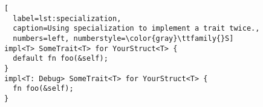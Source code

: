 \begin{lstlisting}[
  label=lst:specialization,
  caption=Using specialization to implement a trait twice.,
  numbers=left, numberstyle=\color{gray}\ttfamily{}S]
impl<T> SomeTrait<T> for YourStruct<T> {
  default fn foo(&self);
}
impl<T: Debug> SomeTrait<T> for YourStruct<T> {
  fn foo(&self);
}
\end{lstlisting}
